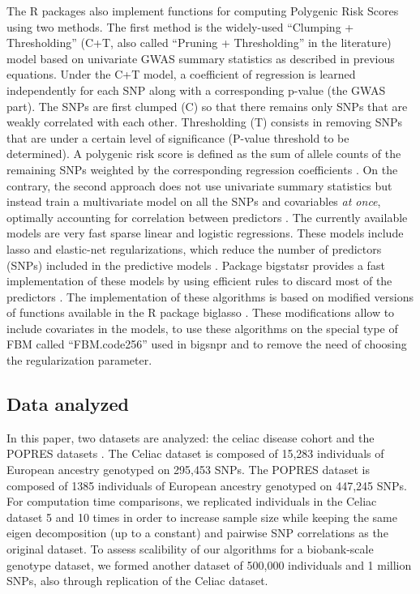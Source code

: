 \documentclass{bioinfo}
\begin{document}
\begin{methods}
The R packages also implement functions for computing Polygenic Risk Scores using two methods. 
{\color{red} The first method is the widely-used ``Clumping + Thresholding'' (C+T, also called ``Pruning + Thresholding'' in the literature) model based on univariate GWAS summary statistics as described in previous equations.}
Under the C+T model, a coefficient of regression is learned independently for each SNP along with a corresponding p-value (the GWAS part). The SNPs are first clumped (C) so that there remains only SNPs that are weakly correlated with each other. Thresholding (T) consists in removing SNPs that are under a certain level of significance (P-value threshold to be determined). A polygenic risk score is defined as the sum of allele counts of the remaining SNPs weighted by the corresponding regression coefficients \cite[]{Chatterjee2013,Dudbridge2013,Euesden2015}. 
On the contrary, the second approach does not use univariate summary statistics but instead train a multivariate model on all the SNPs and covariables \textit{at once}, optimally accounting for correlation between predictors \cite[]{Abraham2012}. The currently available models are very fast sparse linear and logistic regressions. These models include lasso and elastic-net regularizations, which reduce the number of  predictors (SNPs) included in the predictive models \cite[]{Friedman2010,Tibshirani1996,Zou2005}. Package bigstatsr provides a fast implementation of these models by using efficient rules to discard most of the predictors \cite[]{Tibshirani2012}. The implementation of these algorithms is based on modified versions of functions available in the R package biglasso \cite[]{Zeng2017}. These modifications allow to include covariates in the models, to use these algorithms on the special type of FBM called ``FBM.code256'' used in bigsnpr and to remove the need of choosing the regularization parameter.

\subsection{Data analyzed}

In this paper, two datasets are analyzed: the celiac disease cohort and the POPRES datasets \cite[]{Dubois2010,Nelson2008}. The Celiac dataset is composed of 15,283 individuals of European ancestry genotyped on 295,453 SNPs. The POPRES dataset is composed of 1385 individuals of European ancestry genotyped on 447,245 SNPs.
For computation time comparisons, we replicated individuals in the Celiac dataset 5 and 10 times in order to increase sample size while keeping the same {\color{red} eigen decomposition (up to a constant) and pairwise SNP correlations} as the original dataset. To assess scalibility of our algorithms for a biobank-scale genotype dataset, we formed another dataset of 500,000 individuals and 1 million SNPs, also through replication of the Celiac dataset. \label{sec:rep}


\end{methods}
\end{document}
